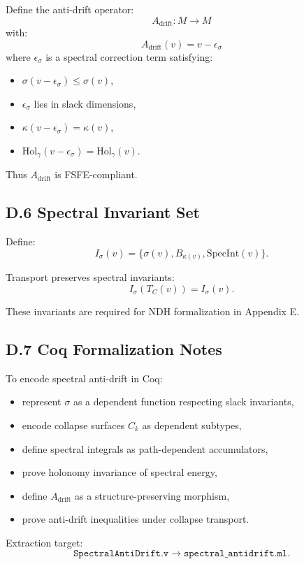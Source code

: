 Define the anti-drift operator:
\[
A_{\mathrm{drift}} : M \rightarrow M
\]
with:
\[
A_{\mathrm{drift}}(v) = v - \epsilon_\sigma
\]
where $\epsilon_\sigma$ is a spectral correction term satisfying:

\begin{itemize}
    \item $\sigma(v - \epsilon_\sigma) \le \sigma(v)$,
    \item $\epsilon_\sigma$ lies in slack dimensions,
    \item $\kappa(v - \epsilon_\sigma) = \kappa(v)$,
    \item $\mathrm{Hol}_\gamma(v - \epsilon_\sigma) = \mathrm{Hol}_\gamma(v)$.
\end{itemize}

Thus $A_{\mathrm{drift}}$ is FSFE-compliant.

\subsection{D.6 Spectral Invariant Set}

Define:
\[
I_\sigma(v) = \{ \sigma(v), B_{\kappa(v)}, \mathrm{SpecInt}(v) \}.
\]

Transport preserves spectral invariants:
\[
I_\sigma(T_C(v)) = I_\sigma(v).
\]

These invariants are required for NDH formalization in Appendix E.

\subsection{D.7 Coq Formalization Notes}

To encode spectral anti-drift in Coq:

\begin{itemize}
    \item represent $\sigma$ as a dependent function respecting slack invariants,
    \item encode collapse surfaces $C_k$ as dependent subtypes,
    \item define spectral integrals as path-dependent accumulators,
    \item prove holonomy invariance of spectral energy,
    \item define $A_{\mathrm{drift}}$ as a structure-preserving morphism,
    \item prove anti-drift inequalities under collapse transport.
\end{itemize}

Extraction target:
\[
\texttt{SpectralAntiDrift.v} \rightarrow \texttt{spectral\_antidrift.ml}.
\]

